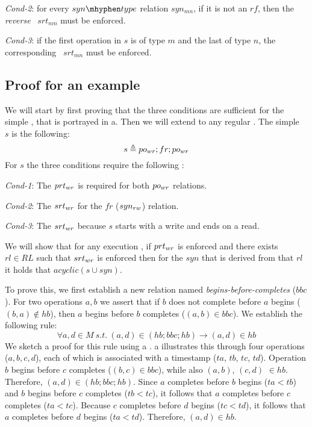 \item \emph{Cond-2}: for every $\syntype$ relation $syn_{mn}$, if it is not an $rf$, then the \emph{reverse} \srt\ $srt_{nm}$ must be enforced. 

\item \emph{Cond-3}: if the first operation in $s$ is of type $m$ and the last of type $n$, the corresponding \srt\ $srt_{mn}$ must be enforced.

\squishend

\subsection{Proof for an example \synpat} \label{sec:rt-cons:pr}
We will start by first proving that the three conditions are sufficient for the simple \synpat, that is portrayed in a. Then we will extend to any regular \synpat.
The simple \synpat\ $s$ is the following:
\begin{equation*}
    s \triangleq po_{wr} ; fr ; po_{wr}
\end{equation*}
For $s$ the three conditions require the following \rts:
\squishlist
\item \emph{Cond-1}: The $prt_{wr}$ is required for both $po_{wr}$ relations.

\item \emph{Cond-2}: The $srt_{wr}$ for the $fr$ (\ie $syn_{rw}$) relation.

\item \emph{Cond-3}: The $srt_{wr}$ because  $s$ starts with a write and ends on a read.
\squishend

\custvspace
We will show that for any execution \Exec, if $prt_{wr}$ is enforced and there exists $rl \in RL$ such that $srt_{wr}$ is enforced then for the $syn$ that is derived from that $rl$ it holds that $acyclic(s \cup syn)$.

To prove this, we first establish a new relation named \emph{begins-before-completes} ($bbc$). 
For two operations $a, b$ we assert that if $b$ does not complete before $a$ begins (\ie $(b, a) \notin hb$), then $a$ begins before $b$ completes (\ie $(a, b) \in bbc$).
We establish the following rule:
\begin{equation*}
 \forall a,d \in M\ s.t.\  (a, d) \in  (hb;bbc;hb) \rightarrow (a,d) \in hb
\end{equation*}
We sketch a proof for this rule using a .
a illustrates this through
four operations ($a,b,c,d$), each of which is associated with a timestamp ($ta$, $tb$, $tc$, $td$).
Operation $b$ begins before $c$ completes (\ie $(b,c)\in bbc$), while also $(a,b)$, $(c, d)$ $\in hb$. Therefore, $(a, d) \in (hb;bbc;hb)$.
Since $a$ completes before $b$ begins ($ta < tb$) and $b$ begins before $c$ completes ($tb < tc$), it follows that $a$ completes before $c$ completes ($ta < tc$). Because $c$ completes before $d$ begins ($tc < td$), it follows that $a$ completes before $d$ begins ($ta < td$). Therefore, $(a, d) \in hb$.

